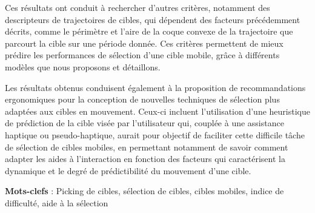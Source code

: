 	Ces résultats ont conduit à rechercher d'autres critères, notamment des descripteurs de trajectoires de cibles, qui dépendent des facteurs précédemment décrits, comme le périmètre et l'aire de la coque convexe de la trajectoire que parcourt la cible sur une période donnée. Ces critères permettent de mieux prédire les performances de sélection d'une cible mobile, grâce à différents modèles que nous proposons et détaillons.

	Les résultats obtenus conduisent également à la proposition de recommandations ergonomiques pour la conception de nouvelles techniques de sélection plus adaptées aux cibles en mouvement. Ceux-ci incluent l'utilisation d'une heuristique de prédiction de la cible visée par l’utilisateur qui, couplée à une assistance haptique ou pseudo-haptique, aurait pour objectif de faciliter cette difficile tâche de sélection de cibles mobiles, en permettant notamment de savoir comment adapter les aides à l'interaction en fonction des facteurs qui caractérisent la dynamique et le degré de prédictibilité du mouvement d'une cible.
 


\textbf{Mots-clefs} : Picking de cibles, sélection de cibles, cibles mobiles, indice de difficulté, aide à la sélection